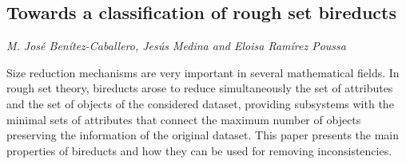 \documentclass[../booklet.tex]{subfiles}
\begin{document}
\subsection[Towards a classification of rough set bireducts. {\it M. José Benítez-Caballero, Jesús Medina and Eloisa Ramírez Poussa}]{Towards a classification of rough set bireducts}
  

\begin{center}
  {\it M. José Benítez-Caballero, Jesús Medina and Eloisa Ramírez Poussa}
\end{center}

\vskip 0.8cm


Size reduction mechanisms are very important  in several mathematical fields. In rough set theory, bireducts arose to reduce  simultaneously  the set of attributes and the set of objects of the considered dataset, providing subsystems with the minimal sets of attributes that connect the maximum number of objects preserving the information of the original dataset. This paper   presents the main properties of bireducts and how they can be used  for removing inconsistencies. 
\end{document}

